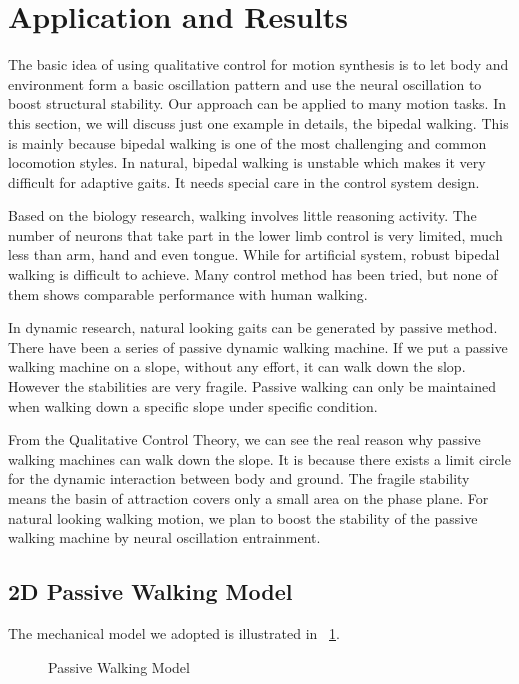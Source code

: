 \section{Application and Results}
The basic idea of using qualitative control for motion synthesis is to let body and environment form a basic oscillation pattern and use the neural oscillation to boost structural stability.
Our approach can be applied to many motion tasks. In this section, we will discuss just one example in details, the bipedal walking. This is mainly because bipedal walking is one of the most challenging and common locomotion styles. In natural, bipedal walking is unstable which makes it very difficult for adaptive gaits. It needs special care in the control system design.

Based on the biology research, walking involves little reasoning activity. The number of neurons that take part in the lower limb control is very limited, much less than arm, hand and even tongue. While for artificial system, robust bipedal walking is difficult to achieve. Many control method has been tried, but none of them shows comparable performance with human walking. 

In dynamic research, natural looking gaits can be generated by passive method. There have been a series of passive dynamic walking machine\citep{McGeer1990,McGeer1990a}. If we put a passive walking machine on a slope, without any effort, it can walk down the slop. However the stabilities are very fragile. Passive walking can only be maintained when walking down a specific slope under specific condition.

From the Qualitative Control Theory, we can see the real reason why passive walking machines can walk down the slope. It is because there exists a limit circle for the dynamic interaction between body and ground. The fragile stability means the basin of attraction covers only a small area on the phase plane. For natural looking walking motion, we plan to boost the stability of the passive walking machine by neural oscillation entrainment.


\subsection{2D Passive Walking Model}
The mechanical model we adopted is illustrated in \figurename ~\ref{fig:2d_walker}. 

\begin{figure}
\begin{center}
\scalebox{0.5}{

}
\caption{Passive Walking Model}
\label{fig:2d_walker}
\end{center}
\end{figure}

